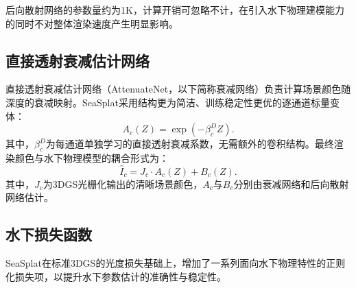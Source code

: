 后向散射网络的参数量约为1K，计算开销可忽略不计，在引入水下物理建模能力的同时不对整体渲染速度产生明显影响。

\subsection{直接透射衰减估计网络}

直接透射衰减估计网络（AttenuateNet，以下简称衰减网络）负责计算场景颜色随深度的衰减映射。SeaSplat采用结构更为简洁、训练稳定性更优的逐通道标量变体：
\begin{equation}
    A_c(Z) = \exp\!\left(-\beta_c^D Z\right).
    \label{eq:attenuation}
\end{equation}其中，$\beta_c^D$为每通道单独学习的直接透射衰减系数，无需额外的卷积结构。最终渲染颜色与水下物理模型的耦合形式为：
\begin{equation}
    \hat{I}_c = J_c \cdot A_c(Z) + B_c(Z).
    \label{eq:final_render}
\end{equation}其中，$J_c$为3DGS光栅化输出的清晰场景颜色，$A_c$与$B_c$分别由衰减网络和后向散射网络估计。

\subsection{水下损失函数}

SeaSplat在标准3DGS的光度损失基础上，增加了一系列面向水下物理特性的正则化损失项，以提升水下参数估计的准确性与稳定性。

